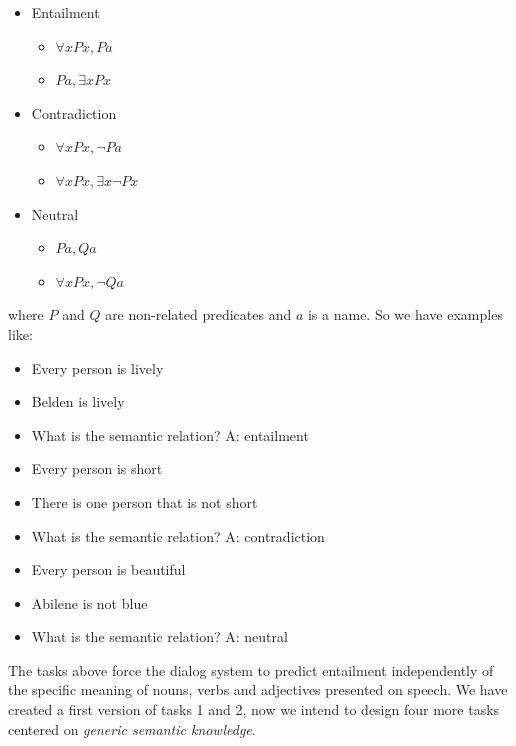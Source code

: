 \begin{itemize}
\item Entailment
\begin{itemize}
\item $\forall x Px, Pa$ 
\item $Pa, \exists x Px$ 
\end{itemize}
\item Contradiction
\begin{itemize}
\item $\forall x Px, \lnot Pa$ 
\item $\forall x Px, \exists x \lnot Px$ 
\end{itemize}
\item Neutral
\begin{itemize}
\item $Pa,Qa$
\item $\forall x Px, \lnot Qa$ 
\end{itemize}
\end{itemize}

where $P$ and $Q$ are non-related predicates and $a$ is a name. So we have examples like:

\begin{itemize} 
\item[] Every person is lively
\item[] Belden is lively
\item[] What is the semantic relation? A: entailment
\end{itemize}

\begin{itemize} 
\item[] Every person is short
\item[] There is one person that is not short
\item[] What is the semantic relation?  A: contradiction
\end{itemize}

\begin{itemize} 
\item[] Every person is beautiful
\item[] Abilene is not blue
\item[] What is the semantic relation? A: neutral
\end{itemize}


The tasks above force the dialog system to predict entailment independently of the specific meaning of nouns, verbs and adjectives presented on speech. We have created a first version of tasks 1 and 2, now we intend to design four more tasks centered on \textit{generic semantic knowledge}.

